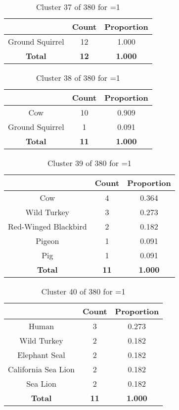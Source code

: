 \begin{table}[ht!]
\centering
\begin{tabular}{|c|c|c|}
\hline
\bf \Spec{} &\bf Count &\bf Proportion\\ \hline \hline
Ground Squirrel & 12 & 1.000\\ \hline
\hline
\bf Total & \bf 12 & \bf 1.000\\ \hline
\end{tabular}
\label{tab:cluster:37:1}
\caption{Cluster 37 of 380 for \minneigh{}=1}
\end{table}

\begin{table}[ht!]
\centering
\begin{tabular}{|c|c|c|}
\hline
\bf \Spec{} &\bf Count &\bf Proportion\\ \hline \hline
Cow & 10 & 0.909\\ \hline
Ground Squirrel & 1 & 0.091\\ \hline
\hline
\bf Total & \bf 11 & \bf 1.000\\ \hline
\end{tabular}
\label{tab:cluster:38:1}
\caption{Cluster 38 of 380 for \minneigh{}=1}
\end{table}

\begin{table}[ht!]
\centering
\begin{tabular}{|c|c|c|}
\hline
\bf \Spec{} &\bf Count &\bf Proportion\\ \hline \hline
Cow & 4 & 0.364\\ \hline
Wild Turkey & 3 & 0.273\\ \hline
Red-Winged Blackbird & 2 & 0.182\\ \hline
Pigeon & 1 & 0.091\\ \hline
Pig & 1 & 0.091\\ \hline
\hline
\bf Total & \bf 11 & \bf 1.000\\ \hline
\end{tabular}
\label{tab:cluster:39:1}
\caption{Cluster 39 of 380 for \minneigh{}=1}
\end{table}

\clearpage
\begin{table}[ht!]
\centering
\begin{tabular}{|c|c|c|}
\hline
\bf \Spec{} &\bf Count &\bf Proportion\\ \hline \hline
Human & 3 & 0.273\\ \hline
Wild Turkey & 2 & 0.182\\ \hline
Elephant Seal & 2 & 0.182\\ \hline
California Sea Lion & 2 & 0.182\\ \hline
Sea Lion & 2 & 0.182\\ \hline
\hline
\bf Total & \bf 11 & \bf 1.000\\ \hline
\end{tabular}
\label{tab:cluster:40:1}
\caption{Cluster 40 of 380 for \minneigh{}=1}
\end{table}

